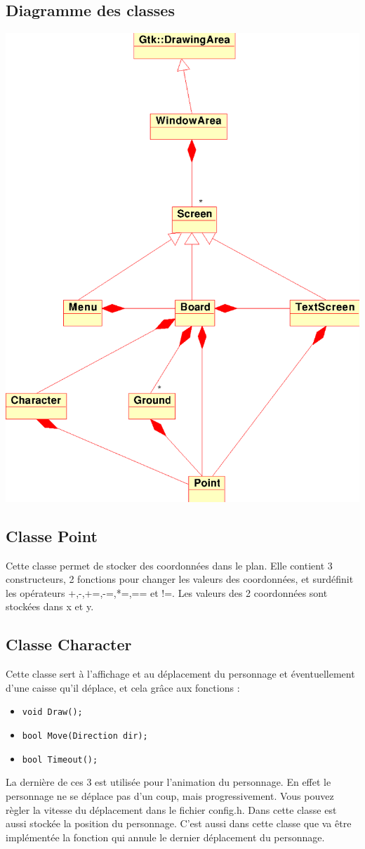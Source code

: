 \documentclass[a4paper,11pt,oneside]{article}
\newcommand{\file}[1]{\textsf{#1}}
\begin{document}
\subsection{Diagramme des classes}
\begin{center}
\includegraphics[height=\textwidth,keepaspectratio=true]{diagramme}
\end{center}

\subsection{Classe Point}
Cette classe permet de stocker des coordonnées dans le plan. Elle contient 3 constructeurs, 2 fonctions pour changer les valeurs des
coordonnées, et surdéfinit les opérateurs +,-,+=,-=,*=,== et !=. Les valeurs des 2 coordonnées sont stockées dans x et y.

\subsection{Classe Character}
Cette classe sert à l'affichage et au déplacement du personnage et éventuellement d'une caisse qu'il déplace, et cela grâce aux
fonctions :
\begin{itemize}
\item\verb|void Draw();|
\item\verb|bool Move(Direction dir);|
\item\verb|bool Timeout();|
\end{itemize}
La dernière de ces 3 est utilisée pour l'animation du personnage. En effet le personnage ne se déplace pas d'un coup, mais
progressivement. Vous pouvez règler la vitesse du déplacement dans le fichier \file{config.h}.
Dans cette classe est aussi stockée la position du personnage.
C'est aussi dans cette classe que va être implémentée la fonction qui annule le dernier déplacement du personnage.
\end{document}
